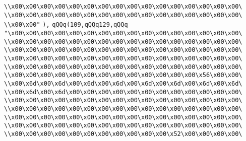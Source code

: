 \verb|\\x00\x00\x00\x00\x00\x00\x00\x00\x00\x00\x00\x00\x00\x00\x00\x00\|\newline
\verb|\\x00\x00\x00\x00\x00\x00\x00\x00\x00\x00\x00\x00\x00\x00\x00\x00\|\newline
\verb|\\x00\x00"|\newline
\verb|),|\newline
\verb|qQQq(109,qQQq129,qQQq|\newline
\verb|"\x00\x00\x00\x00\x00\x00\x00\x00\x00\x00\x00\x00\x00\x00\x00\x00\|\newline
\verb|\\x00\x00\x00\x00\x00\x00\x00\x00\x00\x00\x00\x00\x00\x00\x00\x00\|\newline
\verb|\\x00\x00\x00\x00\x00\x00\x00\x00\x00\x00\x00\x00\x00\x00\x00\x00\|\newline
\verb|\\x00\x00\x00\x00\x00\x00\x00\x00\x00\x00\x00\x00\x00\x00\x00\x00\|\newline
\verb|\\x00\x00\x00\x00\x00\x00\x00\x00\x00\x00\x00\x00\x00\x00\x00\x00\|\newline
\verb|\\x00\x00\x00\x00\x00\x00\x00\x00\x00\x00\x00\x00\x00\x56\x00\x00\|\newline
\verb|\\x00\x6d\x00\x6d\x00\x6d\x00\x6d\x00\x6d\x00\x6d\x00\x6d\x00\x6d\|\newline
\verb|\\x00\x6d\x00\x6d\x00\x00\x00\x00\x00\x00\x00\x00\x00\x00\x00\x00\|\newline
\verb|\\x00\x00\x00\x00\x00\x00\x00\x00\x00\x00\x00\x00\x00\x00\x00\x00\|\newline
\verb|\\x00\x00\x00\x00\x00\x00\x00\x00\x00\x00\x00\x00\x00\x00\x00\x00\|\newline
\verb|\\x00\x00\x00\x00\x00\x00\x00\x00\x00\x00\x00\x00\x00\x00\x00\x00\|\newline
\verb|\\x00\x00\x00\x00\x00\x00\x00\x00\x00\x00\x00\x00\x00\x00\x00\x00\|\newline
\verb|\\x00\x00\x00\x00\x00\x00\x00\x00\x00\x00\x00\x52\x00\x00\x00\x00\|\newline
